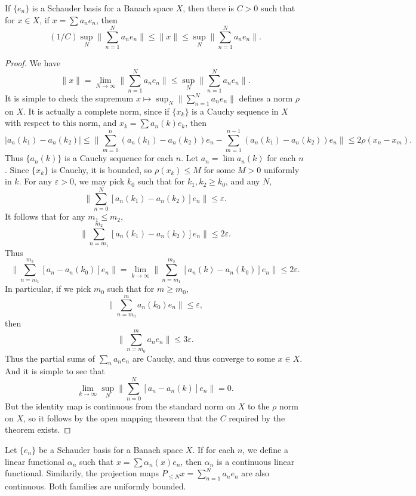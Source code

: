 \begin{theorem}
    If $\{ e_n \}$ is a Schauder basis for a Banach space $X$, then there is $C > 0$ such that for $x \in X$, if $x = \sum a_n e_n$, then
    \[ (1/C) \sup_N \| \sum_{n = 1}^N a_n e_n \| \leq \| x \| \leq \sup_N \| \sum_{n = 1}^N a_n e_n \|. \]
\end{theorem}
\begin{proof}
    We have
    \[ \| x \| = \lim_{N \to \infty} \| \sum_{n = 1}^N a_n e_n \| \leq \sup_N \| \sum_{n = 1}^N a_n e_n \|. \]
    It is simple to check the supremum $x \mapsto \sup_N \| \sum_{n = 1}^N a_n e_n \|$ defines a norm $\rho$ on $X$. It is actually a complete norm, since if $\{ x_k \}$ is a Cauchy sequence in $X$ with respect to this norm, and $x_k = \sum a_n(k) e_k$, then
    \[ |a_n(k_1) - a_n(k_2)| \leq \| \sum_{m = 1}^n (a_n(k_1) - a_n(k_2)) e_n - \sum_{m = 1}^{n-1} (a_n(k_1) - a_n(k_2)) e_n \| \leq 2 \rho(x_n - x_m). \]
    Thus $\{ a_n(k) \}$ is a Cauchy sequence for each $n$. Let $a_n = \lim a_n(k)$ for each $n$. Since $\{ x_k \}$ is Cauchy, it is bounded, so $\rho(x_k) \leq M$ for some $M > 0$ uniformly in $k$. For any $\varepsilon > 0$, we may pick $k_0$ such that for $k_1,k_2 \geq k_0$, and any $N$,
    \[ \| \sum_{n = 0}^N [a_n(k_1) - a_n(k_2)] e_n \| \leq \varepsilon. \]
    It follows that for any $m_1 \leq m_2$,
    \[ \| \sum_{n = m_1}^{m_2} [a_n(k_1) - a_n(k_2)] e_n \| \leq 2 \varepsilon. \]
    Thus
    \[ \| \sum_{n = m_1}^{m_2} [a_n - a_n(k_0)] e_n \| = \lim_{k \to \infty} \| \sum_{n = m_1}^{m_2} [a_n(k) - a_n(k_0)] e_n \| \leq 2 \varepsilon. \]
    In particular, if we pick $m_0$ such that for $m \geq m_0$,
    \[ \| \sum_{n = m_0}^m a_n(k_0) e_n \| \leq \varepsilon, \]
    then
    \[ \| \sum_{n = m_0}^m a_n e_n \| \leq 3 \varepsilon. \]
    Thus the partial sums of $\sum_n a_n e_n$ are Cauchy, and thus converge to some $x \in X$. And it is simple to see that
    \[ \lim_{k \to \infty} \sup_N \| \sum_{n = 0}^N [a_n - a_n(k)] e_n \| = 0. \]
    But the identity map is continuous from the standard norm on $X$ to the $\rho$ norm on $X$, so it follows by the open mapping theorem that the $C$ required by the theorem exists.
\end{proof}

\begin{corollary}
    Let $\{ e_n \}$ be a Schauder basis for a Banach space $X$. If for each $n$, we define a linear functional $\alpha_n$ such that $x = \sum \alpha_n(x) e_n$, then $\alpha_n$ is a continuous linear functional. Similarily, the projection maps $P_{\leq N} x = \sum_{n = 1}^N a_n e_n$ are also continuous. Both families are uniformly bounded.
\end{corollary}

